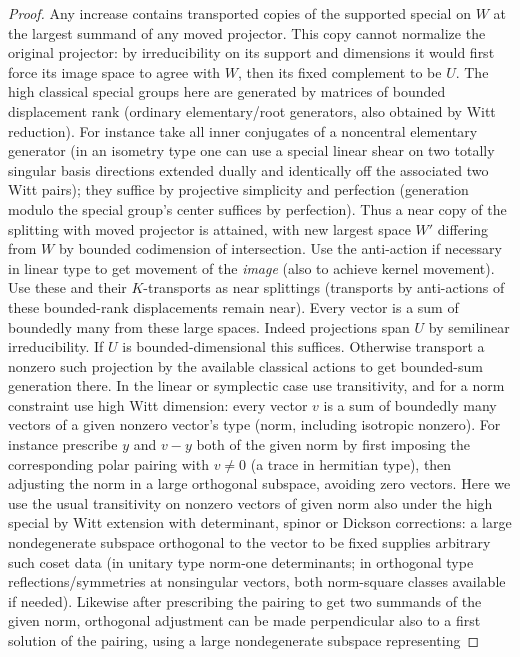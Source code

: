 \begin{proof}
Any increase contains transported copies of the supported special on \(W\) at the largest summand of any
moved projector. This copy cannot normalize the original projector: by irreducibility on its support and
dimensions it would first force its image space to agree with \(W\), then its fixed complement to be
\(U\). The high classical special groups here are generated by matrices of bounded displacement rank
(ordinary elementary/root generators, also obtained by Witt reduction). For instance take all inner
conjugates of a noncentral elementary generator (in an isometry type one can use a special linear shear
on two totally singular basis directions extended dually and identically off the associated two Witt
pairs); they suffice by projective simplicity and perfection (generation modulo the special group's
center suffices by perfection). Thus a near copy of the splitting with moved projector is attained, with
new largest space \(W'\) differing from \(W\) by bounded codimension of intersection. Use the anti-action
if necessary in linear type to get movement of the \emph{image} (also to achieve kernel movement). Use these
and their \(K\)-transports as near splittings (transports by anti-actions of these bounded-rank
displacements remain near). Every vector is a sum of boundedly many from these large spaces. Indeed
projections span \(U\) by semilinear irreducibility. If \(U\) is bounded-dimensional this suffices.
Otherwise transport a nonzero such projection by the available classical actions to get bounded-sum
generation there. In the linear or symplectic case use transitivity, and for a norm constraint use high
Witt dimension: every vector \(v\) is a sum of boundedly many vectors of a given nonzero vector's type
(norm, including isotropic nonzero). For instance prescribe \(y\) and \(v-y\) both of the given norm by
first imposing the corresponding polar pairing with \(v\ne0\) (a trace in hermitian type), then adjusting
the norm in a large orthogonal subspace, avoiding zero vectors. Here we use the usual transitivity on
nonzero vectors of given norm also under the high special by Witt extension with determinant, spinor or
Dickson corrections: a large nondegenerate subspace orthogonal to the vector to be fixed supplies
arbitrary such coset data (in unitary type norm-one determinants; in orthogonal type
reflections/symmetries at nonsingular vectors, both norm-square classes available if needed). Likewise
after prescribing the pairing to get two summands of the given norm, orthogonal adjustment can be made
perpendicular also to a first solution of the pairing, using a large nondegenerate subspace representing

\end{proof}
